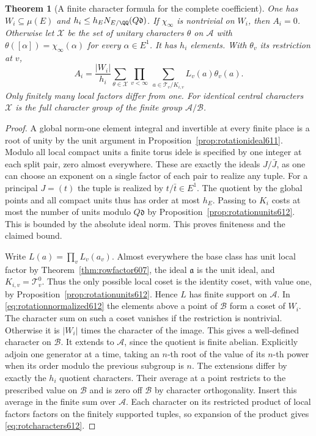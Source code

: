 \documentclass[a4paper,11pt]{article}
\newtheorem{theorem}[proposition]{Theorem}
\theoremstyle{definition}
\theoremstyle{remark}
\numberwithin{equation}{section}
\begin{document}
\begin{theorem}[A finite character formula for the complete coefficient]
\leavevmode\label{thm:rotationcharacters612}
One has \(W_i\subseteq\mu(E)\) and
\(h_i\le h_E N_{E/\QQ}(Q\mathfrak d)\).
If \(\chi_\infty\) is nontrivial on \(W_i\), then \(A_i=0\).
Otherwise let \(\mathcal X\) be the set of unitary characters
\(\theta\) on \(\mathcal A\) with
\(\theta([\alpha])=\chi_\infty(\alpha)\) for every \(\alpha\in E^1\).
It has \(h_i\) elements. With \(\theta_v\) its restriction at \(v\),
\begin{equation}
        A_i=\frac{|W_i|}{h_i}
          \sum_{\theta\in\mathcal X}\prod_{v<\infty}
              \ \sum_{a\in\mathcal T_v/K_{i,v}} L_v(a)\theta_v(a).
 \label{eq:rotcharacters612}
\end{equation}
Only finitely many local factors differ from one. For identical
central characters \(\mathcal X\) is the full character group of
the finite group \(\mathcal A/\mathcal B\).
\end{theorem}
\begin{proof}
A global norm-one element integral and invertible at every finite
place is a root of unity by the unit argument in
Proposition~\ref{prop:rotationideal611}. Modulo all local compact
units a finite torus idele is specified by one integer at each
split pair, zero almost everywhere. These are exactly the ideals
\(J/\bar J\), as one can choose an exponent on a single factor
of each pair to realize any tuple. For a principal \(J=(t)\)
the tuple is realized by \(t/\bar t\in E^1\). The quotient by the
global points and all compact units thus has order at most \(h_E\).
Passing to \(K_i\) costs at most the number of units modulo
\(Q\mathfrak d\) by Proposition~\ref{prop:rotationunits612}.
This is bounded by the absolute ideal norm. This proves finiteness
and the claimed bound.

Write \(L(a)=\prod_v L_v(a_v)\). Almost everywhere the base class
has unit local factor by Theorem~\ref{thm:rowfactor607}, the ideal
\(\mathfrak a\) is the unit ideal, and \(K_{i,v}=\mathcal T_v^0\).
Thus the only possible local coset is the identity coset, with
value one, by Proposition~\ref{prop:rotationunits612}. Hence \(L\)
has finite support on \(\mathcal A\). In \eqref{eq:rotationnormalized612}
the elements above a point of \(\mathcal B\) form a coset of \(W_i\).
The character sum on such a coset vanishes if the restriction is
nontrivial. Otherwise it is \(|W_i|\) times the character of the
image. This gives a well-defined character on \(\mathcal B\).
It extends to \(\mathcal A\), since the quotient is finite abelian.
Explicitly adjoin one generator at a time, taking an \(n\)-th root
of the value of its \(n\)-th power when its order modulo the
previous subgroup is \(n\). The extensions differ by exactly the
\(h_i\) quotient characters. Their average at a point restricts
to the prescribed value on \(\mathcal B\) and is zero off
\(\mathcal B\) by character orthogonality. Insert this average
in the finite sum over \(\mathcal A\). Each character on its
restricted product of local factors factors on the finitely
supported tuples, so expansion of the product gives
\eqref{eq:rotcharacters612}.
\end{proof}
\end{document}
